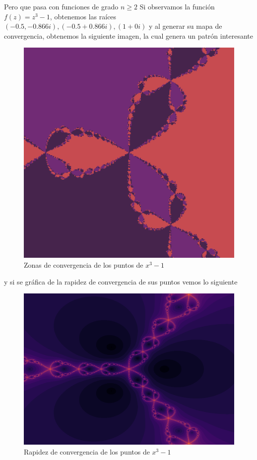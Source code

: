 Pero que pasa con funciones de grado $n \geq 2$
Si observamos la función $f(z) = z^3-1$, obtenemos las raíces $(-0.5,-0.866i),(-0.5+0.866i),(1+0i)$ y al generar su mapa de convergencia, obtenemos la siguiente imagen, la cual genera un patrón interesante
\begin{figure}[H]
    \centering
    \includegraphics{images/eq4-1.png}
    \caption{Zonas de convergencia de los puntos de $ x^3-1$}
    \label{fig:eq_cub_compleja_1}
\end{figure}
y si se gráfica de la rapidez de convergencia de sus puntos vemos lo siguiente
\begin{figure}[H]
    \centering
    \includegraphics[scale=0.26]{images/eq4-2.png}
    \caption{Rapidez de convergencia de los puntos de $ x^3-1$}
    \label{fig:eq_cub_compleja_2}
\end{figure}

